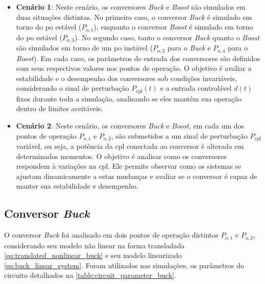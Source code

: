 \begin{itemize}
  \item \textbf{Cenário 1}: Neste cenário, os conversores \textit{Buck} e \textit{Boost} são simulados em duas situações distintas. No primeiro caso, o conversor \textit{Buck} é simulado em torno do \acrshort{po} estável ($P_{\mathrm{o}, 1}$), enquanto o conversor \textit{Boost} é simulado em torno do \acrshort{po} estável ($P_{\mathrm{o}, 3}$). No segundo caso, tanto o conversor \textit{Buck} quanto o \textit{Boost} são simulados em torno de um \acrshort{po} instável ($P_{\mathrm{o}, 2}$ para o \textit{Buck} e $P_{\mathrm{o}, 4}$ para o \textit{Boost}). Em cada caso, os parâmetros de entrada dos conversores são definidos com seus respectivos valores nos pontos de operação. O objetivo é avaliar a estabilidade e o desempenho dos conversores sob condições invariáveis, considerando o sinal de perturbação $P_{\mathrm{cpl}}(t)$ e a entrada controlável $d(t)$ fixos durante toda a simulação, analisando se eles mantêm sua operação dentro de limites aceitáveis. \label{cenario:1}
  \item \textbf{Cenário 2}: Neste cenário, os conversores \textit{Buck} e \textit{Boost}, em cada um dos pontos de operação $P_{\mathrm{o}, 1}$ e $P_{\mathrm{o}, 2}$, são submetidos a um sinal de perturbação $P_{\mathrm{cpl}}$ variável, ou seja, a potência da \acrshort{cpl} conectada ao conversor é alterada em determinados momentos. O objetivo é analisar como os conversores respondem à variações na \acrshort{cpl}. Ele permite observar como os sistemas se ajustam dinamicamente a estas mudanças e avaliar se o conversor é capaz de manter sua estabilidade e desempenho. \label{cenario:2}
\end{itemize}

\subsection{Conversor \textit{Buck}}

O conversor \textit{Buck} foi analisado em dois pontos de operação distintos $P_{\mathrm{o}, 1}$ e $P_{\mathrm{o}, 2}$, considerando seu modelo não linear na forma transladada \eqref{eq:translated_nonlinear_buck} e seu modelo linearizado \eqref{eq:buck_linear_system}. Foram utilizados nas simulações, os parâmetros do circuito detalhados na \autoref{table:circuit_parameter_buck}.

